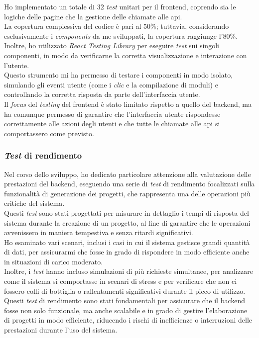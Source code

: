 \noindent Ho implementato un totale di 32 \textit{test} unitari per il \gls{frontend}, coprendo sia le logiche delle pagine che la gestione delle chiamate alle \gls{api}.\\
La copertura complessiva del codice è pari al 50\%; tuttavia, considerando esclusivamente i \textit{components} da me sviluppati, la copertura raggiunge l'80\%.\\
Inoltre, ho utilizzato \textit{React Testing Library} per eseguire \textit{test} sui singoli componenti, in modo da verificarne la corretta visualizzazione e interazione con l'utente. \\
Questo strumento mi ha permesso di testare i componenti in modo isolato, simulando gli eventi utente (come i \textit{clic} e la compilazione di moduli) e controllando la corretta risposta da parte dell'interfaccia utente.\\

\noindent Il \textit{focus} del \textit{testing} del \gls{frontend} è stato limitato rispetto a quello del \gls{backend}, ma ha comunque permesso di garantire che l'interfaccia utente rispondesse correttamente alle azioni degli utenti e che tutte le chiamate alle \gls{api} si comportassero come previsto.

\subsubsection{\textit{Test} di rendimento}  

Nel corso dello sviluppo, ho dedicato particolare attenzione alla valutazione delle prestazioni del \gls{backend}, eseguendo una serie di \textit{test} di rendimento focalizzati sulla funzionalità di generazione dei progetti, che rappresenta una delle operazioni più critiche del sistema. \\

\noindent Questi \textit{test} sono stati progettati per misurare in dettaglio i tempi di risposta del sistema durante la creazione di un progetto, al fine di garantire che le operazioni avvenissero in maniera tempestiva e senza ritardi significativi. \\
Ho esaminato vari scenari, inclusi i casi in cui il sistema gestisce grandi quantità di dati, per assicurarmi che fosse in grado di rispondere in modo efficiente anche in situazioni di carico moderato.\\

\noindent Inoltre, i \textit{test} hanno incluso simulazioni di più richieste simultanee, per analizzare come il sistema si comportasse in scenari di stress e per verificare che non ci fossero colli di bottiglia o rallentamenti significativi durante il picco di utilizzo. \\

\noindent Questi \textit{test} di rendimento sono stati fondamentali per assicurare che il \gls{backend} fosse non solo funzionale, ma anche scalabile e in grado di gestire l'elaborazione di progetti in modo efficiente, riducendo i rischi di inefficienze o interruzioni delle prestazioni durante l'uso del sistema.
